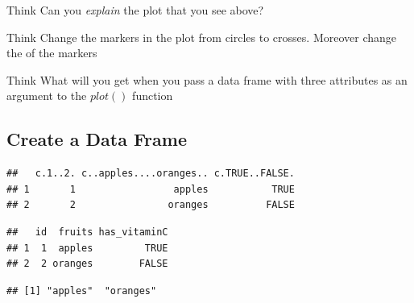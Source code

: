 \documentclass[12pt]{book}\usepackage{knitr}
\begin{document}
\begin{DIY}{Think}
Can you \emph{explain} the plot that you see above?
\end{DIY}

\begin{DIY}{Think}
Change the markers in the plot from circles to crosses. Moreover change the of the markers
\end{DIY}

\begin{DIY}{Think}
What will you get when you pass a data frame with three attributes as an argument to the $plot()$ function
\end{DIY}

\subsection{Create a Data Frame}
\begin{knitrout}
\color{fgcolor}\begin{kframe}
\begin{alltt}
\hlkwb{<-}\hlstd{(}\hlstd{(}\hlstd{,}\hlstd{),}\hlstd{(}\hlstd{,}\hlstd{),}
              \hlstd{(}\hlstd{,}\hlstd{))}  
\end{alltt}
\begin{verbatim}
##   c.1..2. c..apples....oranges.. c.TRUE..FALSE.
## 1       1                 apples           TRUE
## 2       2                oranges          FALSE
\end{verbatim}
\begin{alltt}
\hlkwb{<-}\hlstd{(}\hlstd{,}\hlstd{,}\hlstd{)} 
\end{alltt}
\begin{verbatim}
##   id  fruits has_vitaminC
## 1  1  apples         TRUE
## 2  2 oranges        FALSE
\end{verbatim}
\begin{alltt}
\hlopt{$}
\end{alltt}
\begin{verbatim}
## [1] "apples"  "oranges"
\end{verbatim}
\end{kframe}
\end{knitrout}
\end{document}
